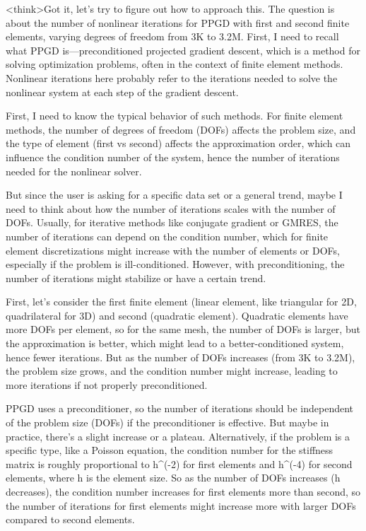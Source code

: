 <think>Got it, let's try to figure out how to approach this. The question is about the number of nonlinear iterations for PPGD with first and second finite elements, varying degrees of freedom from 3K to 3.2M. First, I need to recall what PPGD is—preconditioned projected gradient descent, which is a method for solving optimization problems, often in the context of finite element methods. Nonlinear iterations here probably refer to the iterations needed to solve the nonlinear system at each step of the gradient descent.

First, I need to know the typical behavior of such methods. For finite element methods, the number of degrees of freedom (DOFs) affects the problem size, and the type of element (first vs second) affects the approximation order, which can influence the condition number of the system, hence the number of iterations needed for the nonlinear solver.

But since the user is asking for a specific data set or a general trend, maybe I need to think about how the number of iterations scales with the number of DOFs. Usually, for iterative methods like conjugate gradient or GMRES, the number of iterations can depend on the condition number, which for finite element discretizations might increase with the number of elements or DOFs, especially if the problem is ill-conditioned. However, with preconditioning, the number of iterations might stabilize or have a certain trend.

First, let's consider the first finite element (linear element, like triangular for 2D, quadrilateral for 3D) and second (quadratic element). Quadratic elements have more DOFs per element, so for the same mesh, the number of DOFs is larger, but the approximation is better, which might lead to a better-conditioned system, hence fewer iterations. But as the number of DOFs increases (from 3K to 3.2M), the problem size grows, and the condition number might increase, leading to more iterations if not properly preconditioned.

PPGD uses a preconditioner, so the number of iterations should be independent of the problem size (DOFs) if the preconditioner is effective. But maybe in practice, there's a slight increase or a plateau. Alternatively, if the problem is a specific type, like a Poisson equation, the condition number for the stiffness matrix is roughly proportional to h^(-2) for first elements and h^(-4) for second elements, where h is the element size. So as the number of DOFs increases (h decreases), the condition number increases for first elements more than second, so the number of iterations for first elements might increase more with larger DOFs compared to second elements.

